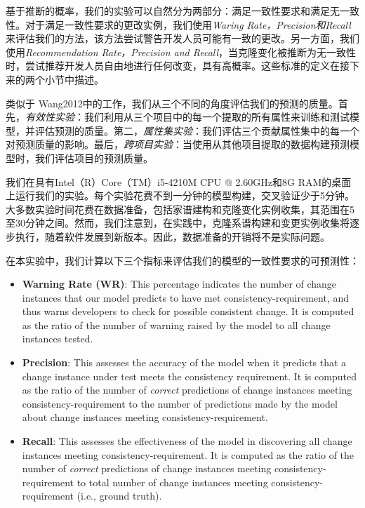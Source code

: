 {基于推断的概率，我们的实验可以自然分为两部分：满足一致性要求和满足无一致性。对于满足一致性要求的更改实例，我们使用{\em Waring Rate，Precision和Recall}来评估我们的方法，该方法尝试警告开发人员可能有一致的更改。另一方面，我们使用{\em Recommendation Rate，Precision and Recall}，当克隆变化被推断为无一致性时，尝试推荐开发人员自由地进行任何改变，具有高概率。这些标准的定义在接下来的两个小节中描述。

类似于\cite{} {Wang2012}中的工作，我们从三个不同的角度评估我们的预测的质量。首先，{\em 有效性实验}：我们利用从三个项目中的每一个提取的所有属性来训练和测试模型，并评估预测的质量。第二，{\em 属性集实验}：我们评估三个贡献属性集中的每一个对预测质量的影响。最后，{\em 跨项目实验}：当使用从其他项目提取的数据构建预测模型时，我们评估项目的预测质量。

我们在具有Intel（R）Core（TM）i5-4210M CPU @ 2.60GHz和8G RAM的桌面上运行我们的实验。每个实验花费不到一分钟的模型构建，交叉验证少于5分钟。大多数实验时间花费在数据准备，包括家谱建构和克隆变化实例收集，其范围在5至30分钟之间。然而，我们注意到，在实践中，克隆系谱构建和变更实例收集将逐步执行，随着软件发展到新版本。因此，数据准备的开销将不是实际问题。

在本实验中，我们计算以下三个指标来评估我们的模型的一致性要求的可预测性：
\begin{itemize}
\item \textbf{Warning Rate (WR)}: 
This percentage indicates the number of change instances that our model predicts to have met consistency-requirement, and thus warns developers to check for possible consistent change.
It is computed as the ratio of the number of warning raised by the model to all change instances tested. 

\item \textbf{Precision}: 
This assesses the accuracy of the model when it predicts that a change instance under test meets the consistency requirement. 
It is computed as the ratio of the number of {\em correct} predictions of change instances meeting consistency-requirement to the number of predictions made by the model about change instances meeting consistency-requirement.

\item \textbf{Recall}: 
This assesses the effectiveness of the model in discovering all change instances meeting consistency-requirement.
It is computed as the ratio of the number of {\em correct} predictions of change instances meeting consistency-requirement to total number of change instances meeting consistency-requirement (i.e., ground truth).
\end{itemize}

}

